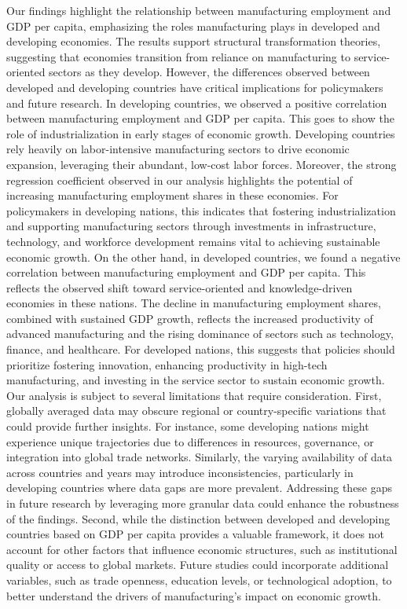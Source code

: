 \documentclass[12pt]{article}
\begin{document}
    Our findings highlight the relationship between manufacturing employment and GDP per capita, emphasizing the roles manufacturing plays in developed and developing economies. The results support structural transformation theories, suggesting that economies transition from reliance on manufacturing to service-oriented sectors as they develop. However, the differences observed between developed and developing countries have critical implications for policymakers and future research.
    In developing countries, we observed a positive correlation between manufacturing employment and GDP per capita. This goes to show the role of industrialization in early stages of economic growth. Developing countries rely heavily on labor-intensive manufacturing sectors to drive economic expansion, leveraging their abundant, low-cost labor forces. Moreover, the strong regression coefficient observed in our analysis highlights the potential of increasing manufacturing employment shares in these economies. For policymakers in developing nations, this indicates that fostering industrialization and supporting manufacturing sectors through investments in infrastructure, technology, and workforce development remains vital to achieving sustainable economic growth. On the other hand, in developed countries, we found a negative correlation between manufacturing employment and GDP per capita. This reflects the observed shift toward service-oriented and knowledge-driven economies in these nations. The decline in manufacturing employment shares, combined with sustained GDP growth, reflects the increased productivity of advanced manufacturing and the rising dominance of sectors such as technology, finance, and healthcare. For developed nations, this suggests that policies should prioritize fostering innovation, enhancing productivity in high-tech manufacturing, and investing in the service sector to sustain economic growth. 
    Our analysis is subject to several limitations that require consideration. First, globally averaged data may obscure regional or country-specific variations that could provide further insights. For instance, some developing nations might experience unique trajectories due to differences in resources, governance, or integration into global trade networks. Similarly, the varying availability of data across countries and years may introduce inconsistencies, particularly in developing countries where data gaps are more prevalent. Addressing these gaps in future research by leveraging more granular data could enhance the robustness of the findings.
    Second, while the distinction between developed and developing countries based on GDP per capita provides a valuable framework, it does not account for other factors that influence economic structures, such as institutional quality or access to global markets. Future studies could incorporate additional variables, such as trade openness, education levels, or technological adoption, to better understand the drivers of manufacturing's impact on economic growth.
\end{document}
